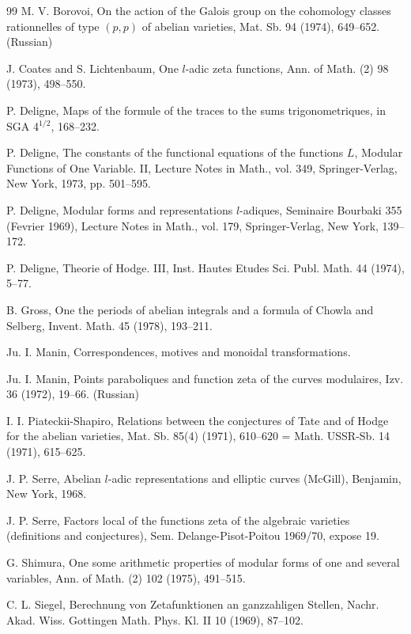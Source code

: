 \documentclass[12pt,a4paper]{article}
\theoremstyle{plain}
\theoremstyle{definition}
\theoremstyle{remark}
\begin{document}
\begin{thebibliography}{99}
M. V. Borovoi, On the action of the Galois group on the cohomology classes rationnelles
of type $(p,p)$ of abelian varieties, Mat. Sb. 94 (1974), 649--652. (Russian)

J. Coates and S. Lichtenbaum, One $l$-adic zeta functions, Ann. of Math. (2) 98 (1973), 498--550.

P. Deligne, Maps of the formule of the traces to the sums trigonometriques, in SGA
4$^{1/2}$, 168--232.

P. Deligne, The constants of the functional equations of the functions $L$, Modular Functions
of One Variable. II, Lecture Notes in Math., vol. 349, Springer-Verlag, New York, 1973,
pp. 501--595.

P. Deligne, Modular forms and representations $l$-adiques, Seminaire Bourbaki 355
(Fevrier 1969), Lecture Notes in Math., vol. 179, Springer-Verlag, New York, 139--172.

P. Deligne, Theorie of Hodge. III, Inst. Hautes Etudes Sci. Publ. Math. 44 (1974), 5--77.

B. Gross, One the periods of abelian integrals and a formula of Chowla and Selberg, Invent.
Math. 45 (1978), 193--211.

Ju. I. Manin, Correspondences, motives and monoidal transformations.

Ju. I. Manin, Points paraboliques and function zeta of the curves modulaires, Izv. 36 (1972), 19--66. (Russian)

I. I. Piateckii-Shapiro, Relations between the conjectures of Tate and of Hodge for the
abelian varieties, Mat. Sb. 85(4) (1971), 610--620 = Math. USSR-Sb. 14 (1971), 615--625.

J. P. Serre, Abelian $l$-adic representations and elliptic curves (McGill), Benjamin, New York, 1968.

J. P. Serre, Factors local of the functions zeta of the algebraic varieties (definitions and
conjectures), Sem. Delange-Pisot-Poitou 1969/70, expose 19.

G. Shimura, One some arithmetic properties of modular forms of one and several variables,
Ann. of Math. (2) 102 (1975), 491--515.

C. L. Siegel, Berechnung von Zetafunktionen an ganzzahligen Stellen, Nachr. Akad. Wiss.
Gottingen Math. Phys. Kl. II 10 (1969), 87--102.


\end{thebibliography}
\end{document}
